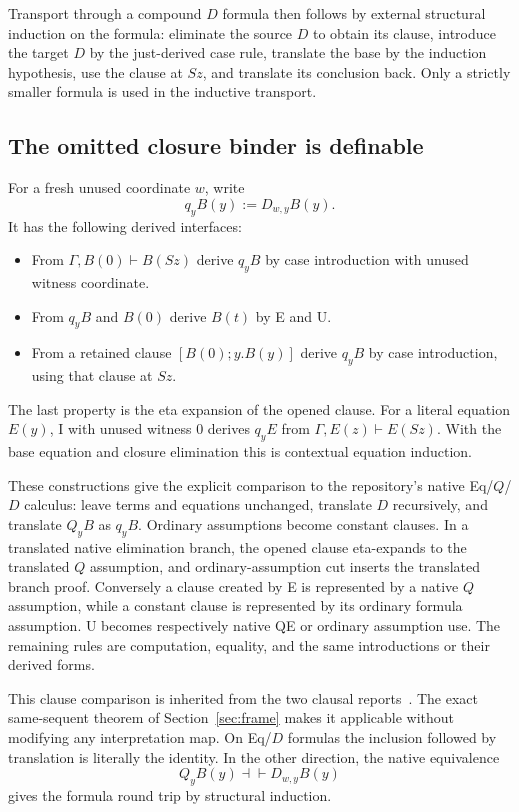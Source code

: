 \documentclass[11pt,letterpaper]{article}
\theoremstyle{definition}
\begin{document}
Transport through a compound $D$ formula then follows by external
structural induction on the formula: eliminate the source $D$
to obtain its clause, introduce the target $D$ by the just-derived
case rule, translate the base by the induction hypothesis, use
the clause at $Sz$, and translate its conclusion back. Only a
strictly smaller formula is used in the inductive transport.

\subsection{The omitted closure binder is definable}

For a fresh unused coordinate $w$, write
\[
                  q_yB(y):=D_{w,y}B(y).
\]
It has the following derived interfaces:
\begin{itemize}
\item From $\Gamma,B(0)\vdash B(Sz)$ derive $q_yB$ by case
      introduction with unused witness coordinate.
\item From $q_yB$ and $B(0)$ derive $B(t)$ by E and U.
\item From a retained clause $[B(0);y.B(y)]$ derive $q_yB$
      by case introduction, using that clause at $Sz$.
\end{itemize}
The last property is the eta expansion of the opened clause.
For a literal equation $E(y)$, I with unused witness $0$
derives $q_yE$ from $\Gamma,E(z)\vdash E(Sz)$. With the
base equation and closure elimination this is contextual
equation induction.

These constructions give the explicit comparison to the repository's
native Eq/$Q$/$D$ calculus: leave terms and equations unchanged,
translate $D$ recursively, and translate $Q_yB$ as $q_yB$.
Ordinary assumptions become constant clauses. In a translated
native elimination branch, the opened clause eta-expands to the
translated $Q$ assumption, and ordinary-assumption cut inserts
the translated branch proof. Conversely a clause created by E
is represented by a native $Q$ assumption, while a constant
clause is represented by its ordinary formula assumption. U
becomes respectively native QE or ordinary assumption use.
The remaining rules are computation, equality, and the same
introductions or their derived forms.

This clause comparison is inherited from the two clausal
reports~\cite{clausal,rawclause}. The exact same-sequent theorem
of Section~\ref{sec:frame} makes it applicable without modifying
any interpretation map. On Eq/$D$ formulas the inclusion followed
by translation is literally the identity. In the other direction,
the native equivalence
\[
                   Q_yB(y)\dashv\vdash D_{w,y}B(y)
\]
gives the formula round trip by structural induction.
\end{document}

